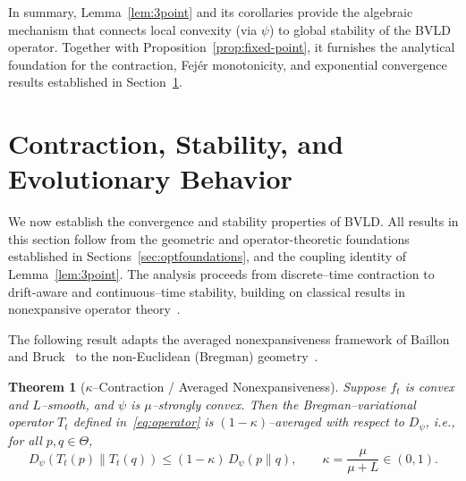\documentclass[11pt]{article}
\theoremstyle{plain}
\newtheorem{theorem}{Theorem}[section]
\theoremstyle{definition}
\theoremstyle{remark}
\begin{document}
In summary, Lemma~\ref{lem:3point} and its corollaries provide the 
algebraic mechanism that connects local convexity (via $\psi$) 
to global stability of the BVLD operator.  
Together with Proposition~\ref{prop:fixed-point}, 
it furnishes the analytical foundation for 
the contraction, Fejér monotonicity, and exponential convergence 
results established in Section~\ref{sec:contraction}.


\section{Contraction, Stability, and Evolutionary Behavior}
\label{sec:contraction}

We now establish the convergence and stability properties of BVLD.  
All results in this section follow from the geometric and operator-theoretic 
foundations established in Sections~\ref{sec:optfoundations}, 
and the coupling identity of Lemma~\ref{lem:3point}.  
The analysis proceeds from discrete--time contraction to drift-aware and 
continuous--time stability, building on classical results in
nonexpansive operator theory~\cite{Baillon1977,Bauschke2017,Combettes2021}.



The following result adapts the averaged nonexpansiveness
framework of Baillon and Bruck~\cite{Baillon1977}
to the non-Euclidean (Bregman) geometry~\cite{Bauschke2017,Combettes2021,Hsieh2023}.

\begin{theorem}[$\kappa$--Contraction / Averaged Nonexpansiveness]
\label{thm:contraction}
Suppose $f_t$ is convex and $L$--smooth, and $\psi$ is $\mu$--strongly convex.  
Then the Bregman--variational operator $T_t$ defined in~\eqref{eq:operator} 
is $(1-\kappa)$--averaged with respect to $D_\psi$, i.e.,
for all $p,q\in\Theta$,
\begin{equation}
D_\psi(T_t(p)\|T_t(q))
\le (1-\kappa)\,D_\psi(p\|q),
\qquad
\kappa=\frac{\mu}{\mu+L}\in(0,1).
\label{eq:contraction}
\end{equation}
\end{theorem}
\end{document}
